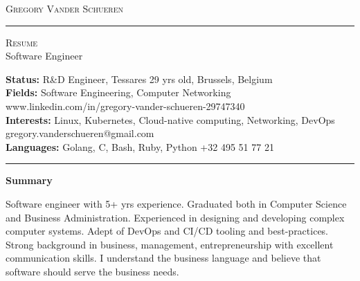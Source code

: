\documentclass[10pt,A4]{article}
\newcommand{\cvsection}[1]
{
	\begin{center}
		\large\textcolor{sectcol}{\textbf{#1}}
	\end{center}
}
\newcommand{\metasection}[2]
{
\footnotesize{#2} \hspace*{\fill} \footnotesize{#1}\\[1pt]
}
\begin{document}
\pagestyle{fancy}	








\vspace{-8pt}
\begin{center}
	\huge \textsc{Gregory Vander Schueren} \textcolor{sectcol}{\rule[-1mm]{1mm}{0.9cm}} \textsc{Resume}\\[2pt]
	\small Software Engineer
\end{center}



\vspace{6pt}


\metasection{29 yrs old, Brussels, Belgium}{\textbf{Status:} R\&D Engineer, Tessares}
\metasection{www.linkedin.com/in/gregory-vander-schueren-29747340}{\textbf{Fields:} Software Engineering, Computer Networking}
\metasection{gregory.vanderschueren@gmail.com}{\textbf{Interests:} Linux, Kubernetes, Cloud-native computing, Networking, DevOps}
\metasection{+32 495 51 77 21}{\textbf{Languages:} Golang, C, Bash, Ruby, Python}
\vspace{-2pt}
\textcolor{softcol}{\hrule}
\vspace{6pt}

\normalsize

\vspace{-6pt}
\cvsection{Summary}
Software engineer with 5+ yrs experience. Graduated both in Computer Science and Business Administration.
Experienced in designing and developing complex computer systems.
Adept of DevOps and CI/CD tooling and best-practices.
Strong background in business, management, entrepreneurship with excellent communication skills.
I understand the business language and believe that software should serve the business needs.
\end{document}
